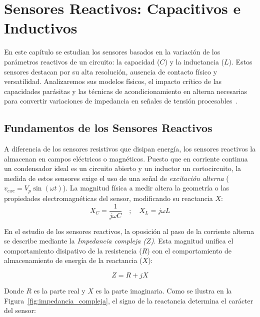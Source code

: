 
\chapter{Sensores Reactivos: Capacitivos e Inductivos}\label{cap:reactivos}

En este capítulo se estudian los sensores basados en la variación de los parámetros reactivos de un circuito: la capacidad ($C$) y la inductancia ($L$). Estos sensores destacan por su alta resolución, ausencia de contacto físico y versatilidad. Analizaremos sus modelos físicos, el impacto crítico de las capacidades parásitas y las técnicas de acondicionamiento en alterna necesarias para convertir variaciones de impedancia en señales de tensión procesables~\cite{fraden2015sensors}.


\section{Fundamentos de los Sensores Reactivos}\label{sec:fundamentos_reactivos}

A diferencia de los sensores resistivos que disipan energía, los sensores reactivos la almacenan en campos eléctricos o magnéticos. Puesto que en corriente continua un condensador ideal es un circuito abierto y un inductor un cortocircuito, la medida de estos sensores exige el uso de una señal de \emph{excitación alterna} ($v_{exc} = V_p \sin(\omega t)$). La magnitud física a medir altera la geometría o las propiedades electromagnéticas del sensor, modificando su reactancia $X$:
\begin{equation}
    X_C = \frac{1}{j\omega C} \quad ; \quad X_L = j\omega L
\end{equation}

En el estudio de los sensores reactivos, la oposición al paso de la corriente alterna se describe mediante la \emph{Impedancia compleja ($\mathit{Z}$)}. Esta magnitud unifica el comportamiento disipativo de la resistencia ($R$) con el comportamiento de almacenamiento de energía de la reactancia ($X$):

\begin{equation}
    Z = R + jX
\end{equation}

Donde $R$ es la parte real y $X$ es la parte imaginaria. Como se ilustra en la Figura~\ref{fig:impedancia_compleja}, el signo de la reactancia determina el carácter del sensor:

